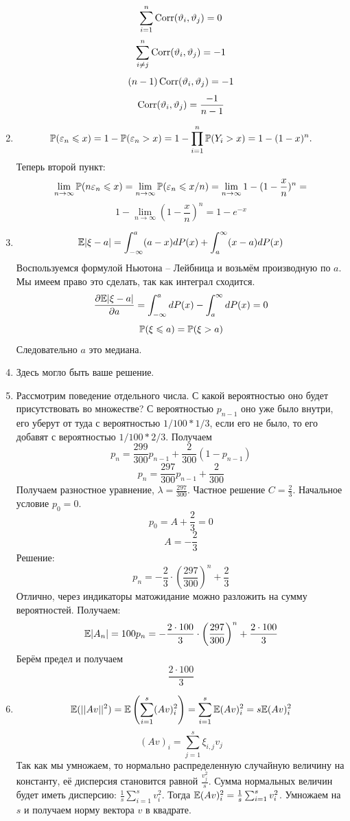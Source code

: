 \documentclass[12pt, a4paper]{article}\usepackage[]{graphicx}\usepackage[]{color}
\begin{document}
\begin{enumerate}
\[							\]
							\[
							\sum_{i = 1}^n \Corr (\vartheta_i, \vartheta_j) = 0
							\]
							\[
							\sum_{i \neq j}^n \Corr (\vartheta_i, \vartheta_j) = -1
							\]
							\[
							(n-1)  \Corr (\vartheta_i, \vartheta_j) = -1
							\]
							\[
							\Corr (\vartheta_i, \vartheta_j) = \frac{-1}{n-1}
							\]
							\item \[
							\P (\varepsilon_n \leq x) = 1 - \P (\varepsilon_n > x) = 1 - \prod_{i = 1}^n  \P (Y_i > x) = 1 - (1 - x)^n.
							\]
							Теперь второй пункт:
							\[
							\lim_{n \rightarrow \infty} \P (n\varepsilon_n \leq x) = \lim_{n \rightarrow \infty} \P (\varepsilon_n \leq x/n) =  \lim_{n \rightarrow \infty} 1 - (1 - \frac{x}{n})^n =
							\]
							\[
							1 - \lim_{n \rightarrow \infty} (1 - \frac{x}{n})^n = 1 - e^{-x}
							\]
							\item \[
							\E |\xi - a| = \int_{-\infty}^a (a - x) dP(x) +  \int_{a}^{\infty} (x- a) dP(x)
							\]
							Воспользуемся формулой Ньютона -- Лейбница и возьмём производную по $a$. Мы имеем право это сделать, так как интеграл сходится.
							\[
							\frac{\partial \E|\xi - a|}{\partial a} = \int_{-\infty}^a dP(x) - \int_{a}^{\infty} dP(x) = 0
							\]
							\[
							\P(\xi \leq a) = \P(\xi > a)
							\]
							Следовательно $a$ это медиана.
							\item Здесь могло быть ваше решение.

							\item Рассмотрим поведение отдельного числа. С какой вероятностью оно будет присутствовать во множестве? С вероятностью $p_{n-1}$ оно уже было внутри, его уберут от туда с вероятностью $1/100 * 1/3$, если его не было, то его добавят с вероятностью $1/100 * 2/3$. Получаем
							\[
							p_n = \frac{299}{300}p_{n - 1} + \frac{2}{300}(1 - p_{n-1})
							\]
							\[
							p_n = \frac{297}{300}p_{n - 1} +  \frac{2}{300}
							\]
							Получаем разностное уравнение, $\lambda = \frac{297}{300}$. Частное решение $C = \frac{2}{3}$. Начальное условие $p_0 = 0$.
							\[
							p_0 = A + \frac{2}{3} = 0
							\]
							\[
							A = -\frac{2}{3}
							\]
							Решение:
							\[
							p_n = -\frac{2}{3} \cdot \left( \frac{297}{300} \right)^n + \frac{2}{3}
							\]
							Отлично, через индикаторы матожидание можно разложить на сумму вероятностей. Получаем:
							\[
							\E |A_n| = 100 p_n = -\frac{2 \cdot 100}{3} \cdot \left( \frac{297}{300} \right)^n + \frac{2 \cdot 100}{3}
							\]
							Берём предел и получаем
							\[
							\frac{2 \cdot 100}{3}
							\]

							\item \[
							\E(||Av||^2) = \E \left(\sum_{i = 1}^s (Av)^2_{i} \right) = \sum_{i = 1}^s \E (Av)^2_{i}  = s \E (Av)^2_{i}
							\]
							\[
							(Av)_i = \sum_{j= 1}^s \xi_{i, j} v_j
							\]
							Так как мы умножаем, то нормально распределенную случайную величину на константу, её дисперсия становится равной $\frac{v_j^2}{s}$. Сумма нормальных величин будет иметь дисперсию: $\frac{1}{s}\sum_{i = 1}^s v_i^2$. Тогда $\E (Av)^2_{i} = \frac{1}{s}\sum_{i = 1}^s v_i^2$. Умножаем на $s$ и получаем норму вектора $v$ в квадрате.


						\end{enumerate}
\end{document}
